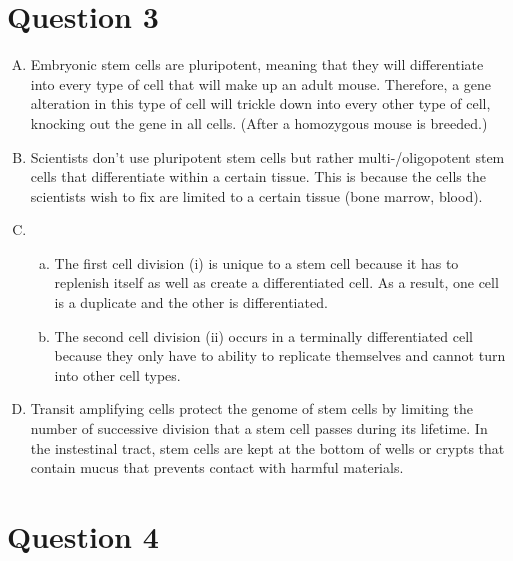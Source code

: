 \documentclass{article}
\begin{document}
\section*{Question 3}

\begin{enumerate}[A.]
    \item Embryonic stem cells are pluripotent, meaning that they will
        differentiate into every type of cell that will make up an adult mouse.
        Therefore, a gene alteration in this type of cell will trickle down into
        every other type of cell, knocking out the gene in all cells. (After a
        homozygous mouse is breeded.)
    \item Scientists don't use pluripotent stem cells but rather
        multi-/oligopotent stem cells that differentiate within a certain
        tissue. This is because the cells the scientists wish to fix are limited
        to a certain tissue (bone marrow, blood).
    \item
        \begin{enumerate}[a.]
            \item The first cell division (i) is unique to a stem cell because it
                has to replenish itself as well as create a differentiated cell.
                As a result, one cell is a duplicate and the other is
                differentiated.
            \item The second cell division (ii) occurs in a terminally
                differentiated cell because they only have to ability to
                replicate themselves and cannot turn into other cell types.
        \end{enumerate}
    \item Transit amplifying cells protect the genome of stem cells by limiting
        the number of successive division that a stem cell passes during its
        lifetime. In the instestinal tract, stem cells are kept at the bottom of
        wells or crypts that contain mucus that prevents contact with harmful
        materials.
\end{enumerate}

\section*{Question 4}
\end{document}
